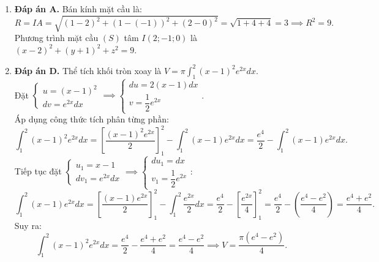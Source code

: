 \documentclass[12pt,a4paper]{article}
\begin{document}
\begin{enumerate}[label=\textbf{Câu \arabic*:}, leftmargin=*]
\item \textbf{Đáp án A.}
Bán kính mặt cầu là:
$$R = IA = \sqrt{(1 - 2)^2 + (1 - (-1))^2 + (2 - 0)^2} = \sqrt{1 + 4 + 4} = 3 \implies R^2 = 9.$$
Phương trình mặt cầu $(S)$ tâm $I(2; -1; 0)$ là $(x - 2)^2 + (y + 1)^2 + z^2 = 9$.

\item \textbf{Đáp án D.}
Thể tích khối tròn xoay là $V = \pi \int_1^2 (x - 1)^2 e^{2x} dx$.\\
Đặt $\begin{cases} u = (x - 1)^2 \\ dv = e^{2x} dx \end{cases} \implies \begin{cases} du = 2(x - 1) dx \\ v = \dfrac{1}{2} e^{2x} \end{cases}$.\\
Áp dụng công thức tích phân từng phần:
$$\int_1^2 (x - 1)^2 e^{2x} dx = \left[ \dfrac{(x - 1)^2 e^{2x}}{2} \right]_1^2 - \int_1^2 (x - 1) e^{2x} dx = \dfrac{e^4}{2} - \int_1^2 (x - 1) e^{2x} dx.$$
Tiếp tục đặt $\begin{cases} u_1 = x - 1 \\ dv_1 = e^{2x} dx \end{cases} \implies \begin{cases} du_1 = dx \\ v_1 = \dfrac{1}{2} e^{2x} \end{cases}$:
$$\int_1^2 (x - 1) e^{2x} dx = \left[ \dfrac{(x - 1) e^{2x}}{2} \right]_1^2 - \int_1^2 \dfrac{e^{2x}}{2} dx = \dfrac{e^4}{2} - \left[ \dfrac{e^{2x}}{4} \right]_1^2 = \dfrac{e^4}{2} - \left( \dfrac{e^4 - e^2}{4} \right) = \dfrac{e^4 + e^2}{4}.$$
Suy ra:
$$\int_1^2 (x - 1)^2 e^{2x} dx = \dfrac{e^4}{2} - \dfrac{e^4 + e^2}{4} = \dfrac{e^4 - e^2}{4} \implies V = \dfrac{\pi(e^4 - e^2)}{4}.$$
\end{enumerate}
\end{document}
